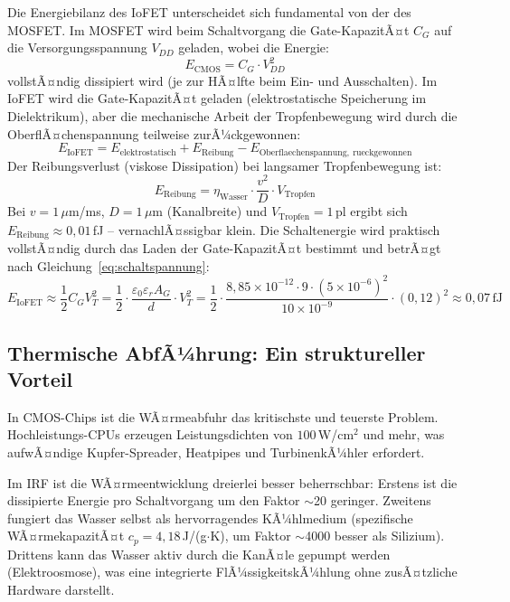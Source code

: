 ﻿\documentclass[a4paper,12pt]{scrreprt}
\theoremstyle{definition}
\begin{document}
Die Energiebilanz des IoFET unterscheidet sich fundamental von der des MOSFET.
Im MOSFET wird beim Schaltvorgang die Gate-KapazitÃ¤t $C_G$ auf die
Versorgungsspannung $V_{DD}$ geladen, wobei die Energie:
\begin{equation}
	E_{\mathrm{CMOS}} = C_G \cdot V_{DD}^2
	\label{eq:cmos_energie}
\end{equation}
vollstÃ¤ndig dissipiert wird (je zur HÃ¤lfte beim Ein- und Ausschalten).
Im IoFET wird die Gate-KapazitÃ¤t geladen (elektrostatische Speicherung
im Dielektrikum), aber die mechanische Arbeit der Tropfenbewegung wird
durch die OberflÃ¤chenspannung teilweise zurÃ¼ckgewonnen:
\begin{equation}
	E_{\mathrm{IoFET}} = E_{\mathrm{elektrostatisch}} + E_{\mathrm{Reibung}} - E_{\mathrm{Oberflaechenspannung,~rueckgewonnen}}
	\label{eq:iofet_energie}
\end{equation}
Der Reibungsverlust (viskose Dissipation) bei langsamer Tropfenbewegung ist:
\begin{equation}
	E_{\mathrm{Reibung}} = \eta_{\mathrm{Wasser}} \cdot \frac{v^2}{D} \cdot V_{\mathrm{Tropfen}}
	\label{eq:reibungsenergie}
\end{equation}
Bei $v = 1\,\mu$m/ms, $D = 1\,\mu$m (Kanalbreite) und $V_{\mathrm{Tropfen}} = 1$\,pl
ergibt sich $E_{\mathrm{Reibung}} \approx 0{,}01$\,fJ -- vernachlÃ¤ssigbar klein.
Die Schaltenergie wird praktisch vollstÃ¤ndig durch das Laden der Gate-KapazitÃ¤t
bestimmt und betrÃ¤gt nach Gleichung~\eqref{eq:schaltspannung}:
\begin{equation}
	E_{\mathrm{IoFET}} \approx \frac{1}{2} C_G V_T^2 = \frac{1}{2} \cdot
	\frac{\varepsilon_0 \varepsilon_r A_G}{d} \cdot V_T^2
	= \frac{1}{2} \cdot \frac{8{,}85 \times 10^{-12} \cdot 9 \cdot (5 \times 10^{-6})^2}
	{10 \times 10^{-9}} \cdot (0{,}12)^2 \approx 0{,}07\,\text{fJ}
	\label{eq:schaltenergie_beispiel}
\end{equation}

\subsection{Thermische AbfÃ¼hrung: Ein struktureller Vorteil}

In CMOS-Chips ist die WÃ¤rmeabfuhr das kritischste und teuerste Problem.
Hochleis\-tungs-CPUs erzeugen Leistungsdichten von $100$\,W/cm$^2$ und mehr,
was aufwÃ¤ndige Kupfer-Spreader, Heatpipes und TurbinenkÃ¼hler erfordert.

Im IRF ist die WÃ¤rme\-entwicklung dreierlei besser beherrschbar:
Erstens ist die dissipierte Energie pro Schaltvorgang um den Faktor
$\sim$20 geringer. Zweitens fungiert das Wasser selbst als hervorragendes
KÃ¼hlmedium (spezifische WÃ¤rmekapazitÃ¤t $c_p = 4{,}18$\,J/(g$\cdot$K),
um Faktor $\sim$4000 besser als Silizium). Drittens kann das Wasser
aktiv durch die KanÃ¤le gepumpt werden (Elektroosmose), was eine
integrierte FlÃ¼ssigkeitskÃ¼hlung ohne zusÃ¤tzliche Hardware darstellt.
\end{document}
